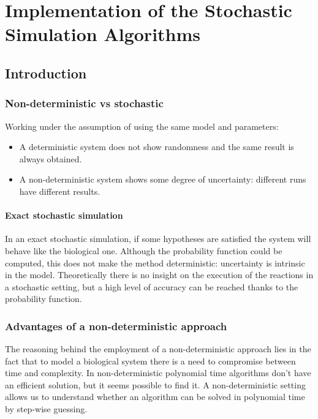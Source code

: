 \graphicspath{{chapters/03/images/}}
\chapter{Implementation of the Stochastic Simulation Algorithms}

\section{Introduction}

  \subsection{Non-deterministic vs stochastic}
  Working under the assumption of using the same model and parameters:

  \begin{multicols}{2}
    \begin{itemize}
      \item A deterministic system does not show randomness and the same result is always obtained.
      \item A non-deterministic system shows some degree of uncertainty: different runs have different results.
    \end{itemize}
  \end{multicols}

    \subsubsection{Exact stochastic simulation}
    In an exact stochastic simulation, if some hypotheses are satisfied the system will behave like the biological one.
    Although the probability function could be computed, this does not make the method deterministic: uncertainty is intrinsic in the model.
    Theoretically there is no insight on the execution of the reactions in a stochastic setting, but a high level of accuracy can be reached thanks to the probability function.

  \subsection{Advantages of a non-deterministic approach}
  The reasoning behind the employment of a non-deterministic approach lies in the fact that to model a biological system there is a need to compromise between time and complexity.
  In non-deterministic polynomial time algorithms don't have an efficient solution, but it seems possible to find it.
  A non-deterministic setting allows us to understand whether an algorithm can be solved in polynomial time by step-wise guessing.

